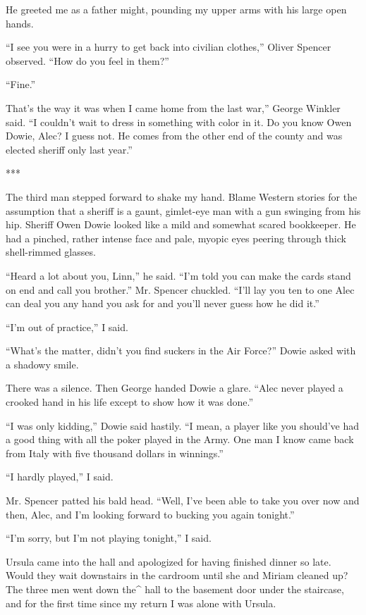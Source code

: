 \documentclass{novel}
\begin{document}
{He greeted me as a father might, pounding my upper arms with his large open hands.

“I see you were in a hurry to get back into civilian clothes,” Oliver Spencer observed. “How do you feel in them?”

“Fine.”

That’s the way it was when I came home from the last war,” George Winkler said. “I couldn’t wait to dress in something with color in it. Do you know Owen Dowie, Alec? I guess not. He comes from the other end of the county and was elected sheriff only last year.”

***

The third man stepped forward to shake my hand. Blame Western stories for the assumption that a sheriff is a gaunt, gimlet-eye man with a gun swinging from his hip. Sheriff Owen Dowie looked like a mild and somewhat scared bookkeeper. He had a pinched, rather intense face and pale, myopic eyes peering through thick shell-rimmed glasses.

“Heard a lot about you, Linn,” he said. “I’m told you can make the cards stand on end and call you brother.” Mr. Spencer chuckled. “I’ll lay you ten to one Alec can deal you any hand you ask for and you’ll never guess how he did it.”

“I’m out of practice,” I said.

“What’s the matter, didn’t you find suckers in the Air Force?” Dowie asked with a shadowy smile.

There was a silence. Then George handed Dowie a glare. “Alec never played a crooked hand in his life except to show how it was done.”

“I was only kidding,” Dowie said hastily. “I mean, a player like you should’ve had a good thing with all the poker played in the Army. One man I know came back from Italy with five thousand dollars in winnings.”

“I hardly played,” I said.

Mr. Spencer patted his bald head. “Well, I’ve been able to take you over now and then, Alec, and I’m looking forward to bucking you again tonight.”

“I’m sorry, but I’m not playing tonight,” I said.

Ursula came into the hall and apologized for having finished dinner so late. Would they wait downstairs in the cardroom until she and Miriam cleaned up? The three men went down the^ hall to the basement door under the staircase, and for the first time since my return I was alone with Ursula.

}
\end{document}

